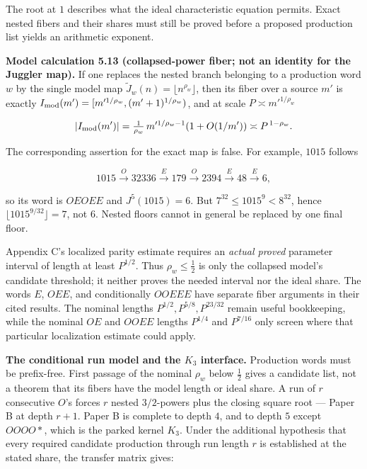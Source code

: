 \documentclass[11pt,a4paper]{article}
\begin{document}
The root at \(1\) describes what the ideal characteristic equation
permits. Exact nested fibers and their shares must still be proved
before a proposed production list yields an arithmetic exponent.

\textbf{Model calculation 5.13 (collapsed-power fiber; not an identity
for the Juggler map).} If one replaces the nested branch belonging to a
production word \(w\) by the single model map
\(\widetilde J_w(n)=\lfloor n^{\rho_w}\rfloor\), then its fiber over a
source \(m'\) is exactly
\(I_{\rm mod}(m')=[m'^{1/\rho_w},(m'+1)^{1/\rho_w})\), and at scale
\(P\asymp m'^{1/\rho_w}\)

\[
|I_{\rm mod}(m')|
=\tfrac1{\rho_w}\,m'^{1/\rho_w-1}(1+O(1/m'))
\asymp P^{\,1-\rho_w}.
\]

The corresponding assertion for the exact map is false. For example,
\(1015\) follows

\[
1015\xrightarrow O32336\xrightarrow E179\xrightarrow O2394
\xrightarrow E48\xrightarrow E6,
\]

so its word is \(OEOEE\) and \(J^5(1015)=6\). But
\(7^{32}\le1015^9<8^{32}\), hence \(\lfloor1015^{9/32}\rfloor=7\), not
\(6\). Nested floors cannot in general be replaced by one final floor.

Appendix C's localized parity estimate requires an \emph{actual proved}
parameter interval of length at least \(P^{1/2}\). Thus
\(\rho_w\le\tfrac12\) is only the collapsed model's candidate threshold;
it neither proves the needed interval nor the ideal share. The words
\(E\), \(OEE\), and conditionally \(OOEEE\) have separate fiber
arguments in their cited results. The nominal lengths
\(P^{1/2},P^{5/8},P^{23/32}\) remain useful bookkeeping, while the
nominal \(OE\) and \(OOEE\) lengths \(P^{1/4}\) and \(P^{7/16}\) only
screen where that particular localization estimate could apply.

\textbf{The conditional run model and the \(K_3\) interface.} Production
words must be prefix-free. First passage of the nominal \(\rho_w\) below
\(\tfrac12\) gives a candidate list, not a theorem that its fibers have
the model length or ideal share. A run of \(r\) consecutive \(O\)'s
forces \(r\) nested \(3/2\)-powers plus the closing square root ---
Paper B at depth \(r+1\). Paper B is complete to depth \(4\), and to
depth \(5\) except \(OOOO*\), which is the parked kernel \(K_3\). Under
the additional hypothesis that every required candidate production
through run length \(r\) is established at the stated share, the
transfer matrix gives:
\end{document}
